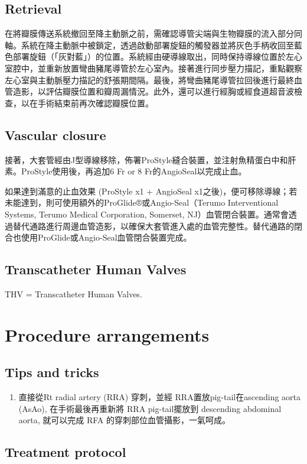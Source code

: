 \documentclass[nols]{tufte-book}
\begin{document}
\subsection{Retrieval}

在將瓣膜傳送系統撤回至降主動脈之前，需確認導管尖端與生物瓣膜的流入部分同軸。系統在降主動脈中被鎖定，透過啟動部署旋鈕的觸發器並將灰色手柄收回至藍色部署旋鈕（「灰對藍」）的位置。系統經由硬導線取出，同時保持導線位置於左心室腔中，並重新放置彎曲豬尾導管於左心室內。接著進行同步壓力描記，重點觀察左心室與主動脈壓力描記的舒張期間隔。最後，將彎曲豬尾導管拉回後進行最終血管造影，以評估瓣膜位置和瓣周漏情況。此外，還可以進行經胸或經食道超音波檢查，以在手術結束前再次確認瓣膜位置。

\subsection{Vascular closure}

接著，大套管經由J型導線移除，佈署ProStyle縫合裝置，並注射魚精蛋白中和肝素。ProStyle使用後，再追加6 Fr or 8 Fr的AngioSeal以完成止血。

如果達到滿意的止血效果 (ProStyle x1 + AngioSeal x1之後)，便可移除導線；若未能達到，則可使用額外的ProGlide®或Angio-Seal（Terumo Interventional Systems, Terumo Medical Corporation, Somerset, NJ）血管閉合裝置。通常會透過替代通路進行周邊血管造影，以確保大套管進入處的血管完整性。替代通路的閉合也使用ProGlide或Angio-Seal血管閉合裝置完成。

\subsection{Transcatheter Human Valves}
THV = Transcatheter Human Valves.


\section{Procedure arrangements}
\subsection{Tips and tricks}
\begin{enumerate}
    \item 直接從Rt radial artery (RRA) 穿刺，並經 RRA置放pig-tail在ascending aorta (AsAo), 在手術最後再重新將 RRA pig-tail擺放到 descending abdominal aorta, 就可以完成 RFA 的穿刺部位血管攝影，一氣呵成。
\end{enumerate}

\subsection{Treatment protocol}
\end{document}
